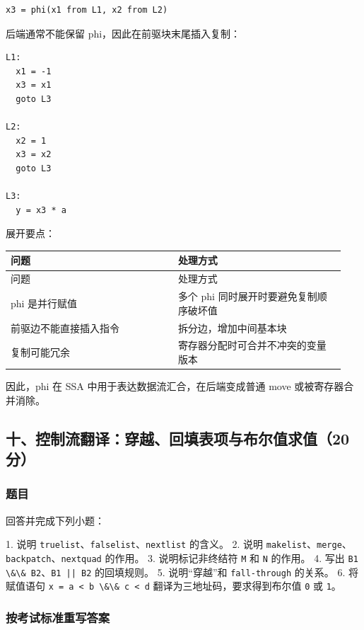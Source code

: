 \documentclass[UTF8]{ctexart}
\begin{document}
\begin{Verbatim}[fontsize=\small,breaklines=true]
x3 = phi(x1 from L1, x2 from L2)
\end{Verbatim}

后端通常不能保留 phi，因此在前驱块末尾插入复制：

\begin{Verbatim}[fontsize=\small,breaklines=true]
L1:
  x1 = -1
  x3 = x1
  goto L3

L2:
  x2 = 1
  x3 = x2
  goto L3

L3:
  y = x3 * a
\end{Verbatim}

展开要点：

\begin{longtable}{|p{0.47\linewidth}|p{0.47\linewidth}|}
\hline
问题 & 处理方式 \\
\hline
\endfirsthead
问题 & 处理方式 \\
\hline
\endhead
phi 是并行赋值 & 多个 phi 同时展开时要避免复制顺序破坏值 \\
\hline
前驱边不能直接插入指令 & 拆分边，增加中间基本块 \\
\hline
复制可能冗余 & 寄存器分配时可合并不冲突的变量版本 \\
\hline
\end{longtable}

因此，phi 在 SSA 中用于表达数据流汇合，在后端变成普通 move 或被寄存器合并消除。

\subsection*{十、控制流翻译：穿越、回填表项与布尔值求值（20 分）}

\subsubsection*{题目}

回答并完成下列小题：

1. 说明 \texttt{truelist}、\texttt{falselist}、\texttt{nextlist} 的含义。 2. 说明 \texttt{makelist}、\texttt{merge}、\texttt{backpatch}、\texttt{nextquad} 的作用。 3. 说明标记非终结符 \texttt{M} 和 \texttt{N} 的作用。 4. 写出 \texttt{B1 \textbackslash{}\&\textbackslash{}\& B2}、\texttt{B1 || B2} 的回填规则。 5. 说明“穿越”和 \texttt{fall-through} 的关系。 6. 将赋值语句 \texttt{x = a < b \textbackslash{}\&\textbackslash{}\& c < d} 翻译为三地址码，要求得到布尔值 \texttt{0} 或 \texttt{1}。

\subsubsection*{按考试标准重写答案}
\end{document}
